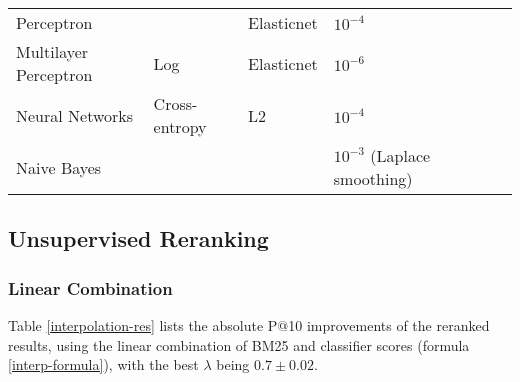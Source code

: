 \begin{table}[]
{\begin{tabular}{@{}llllll@{}}
Perceptron                      &			& Elasticnet             & $10^{-4}$                                            &  &  \\
Multilayer Perceptron          & Log			& Elasticnet       & $10^{-6}$                                                        &  &  \\
Neural Networks                 & Cross-entropy		& L2               & $10^{-4}$ &  &  \\ 
Naive Bayes                    	& 			 &              & $10^{-3}$ (Laplace smoothing)                            &  &  \\\bottomrule
\end{tabular}%
}
\end{table}

\subsection{Unsupervised Reranking}

\subsubsection{Linear Combination}
Table \ref{interpolation-res} lists the absolute P@10 improvements of the reranked results, using the linear combination of BM25 and classifier scores (formula \ref{interp-formula}),
with the best $\lambda$ being $0.7\pm 0.02$.

